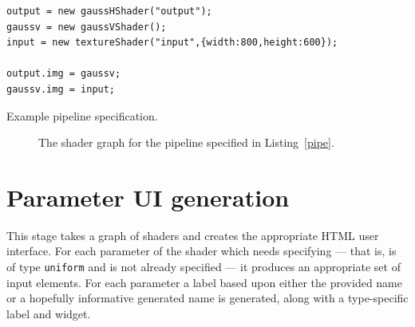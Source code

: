 \documentclass[12pt,twoside,notitlepage]{report}
\begin{document}
\begin{listing}[H]
\begin{verbatim}
output = new gaussHShader("output");
gaussv = new gaussVShader();
input = new textureShader("input",{width:800,height:600});

output.img = gaussv;
gaussv.img = input;
\end{verbatim}
\caption{Example pipeline specification.\label{pipe}}
\end{listing}

\begin{figure}

\caption{The shader graph for the pipeline specified in Listing~\ref{pipe}.\label{pipe-graph}}
\end{figure}

\clearpage
\section{Parameter UI generation}
\label{ui-params}
This stage takes a graph of shaders and creates the appropriate HTML user interface. For each parameter of the shader which needs specifying --- that is, is of type \texttt{uniform} and is not already specified --- it produces an appropriate set of input elements. For each parameter a label based upon either the provided name or a hopefully informative generated name is generated, along with a type-specific label and widget.
\end{document}
